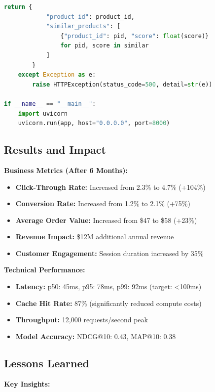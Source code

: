 \begin{lstlisting}[language=Python, caption=Recommendation Serving API]
        return {
            "product_id": product_id,
            "similar_products": [
                {"product_id": pid, "score": float(score)}
                for pid, score in similar
            ]
        }
    except Exception as e:
        raise HTTPException(status_code=500, detail=str(e))

if __name__ == "__main__":
    import uvicorn
    uvicorn.run(app, host="0.0.0.0", port=8000)
\end{lstlisting}

\subsection{Results and Impact}

\textbf{Business Metrics (After 6 Months):}

\begin{itemize}
    \item \textbf{Click-Through Rate:} Increased from 2.3\% to 4.7\% (+104\%)
    \item \textbf{Conversion Rate:} Increased from 1.2\% to 2.1\% (+75\%)
    \item \textbf{Average Order Value:} Increased from \$47 to \$58 (+23\%)
    \item \textbf{Revenue Impact:} \$12M additional annual revenue
    \item \textbf{Customer Engagement:} Session duration increased by 35\%
\end{itemize}

\textbf{Technical Performance:}

\begin{itemize}
    \item \textbf{Latency:} p50: 45ms, p95: 78ms, p99: 92ms (target: <100ms)
    \item \textbf{Cache Hit Rate:} 87\% (significantly reduced compute costs)
    \item \textbf{Throughput:} 12,000 requests/second peak
    \item \textbf{Model Accuracy:} NDCG@10: 0.43, MAP@10: 0.38
\end{itemize}

\subsection{Lessons Learned}

\textbf{Key Insights:}


